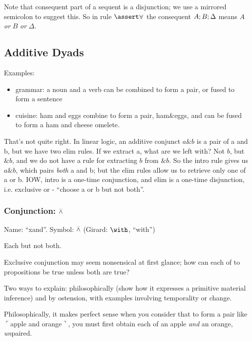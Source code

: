 \documentclass{article}
\begin{document}
Note that consequent part of a sequent is a disjunction; we use a
mirrored semicolon to suggest this. So in rule \(\linfer\fission\) the
consequent \(A\structor B\structor\Delta\) means \(A\) \textit{or}
\(B\) \textit{or} \(\Delta\).

\subsection{Additive Dyads}

Examples:

\begin{itemize}
\item grammar: a noun and a verb can be combined to form a pair, or fused to form a sentence
  \item cuisine: ham and eggs combine to form a pair, ham\&eggs, and
    can be fused to form a ham and cheese omelete.
\end{itemize}

That's not quite right. In linear logic, an additive conjunct \(a\&b\)
is a pair of a and b, but we have two elim rules. If we extract a,
what are we left with? Not \(b\), but \(\&b\), and we do not have a
rule for extracting \(b\) from \(\&b\). So the intro rule gives us
\(a\&b\), which pairs \textit{both} a and b; but the elim rules allow
us to retrieve only one of a or b. IOW, intro is a one-time
conjunction, and elim is a one-time disjunction, i.e. exclusive or -
``choose a or b but not both''.



\subsubsection[Conjunction: each but not both]{Conjunction: \(\barwedge\)}

Name: ``xand''.  Symbol: \(\barwedge\) (Girard: \(\with\), ``with'')

Each but not both.

Exclusive conjunction may seem nonsensical at first glance; how can
each of to propositions be true unless both are true?

Two ways to explain: philosophically (show how it expresses a primitive
material inference) and by ostension, with examples involving
temporality or change.

Philosophically, it makes perfect sense when you consider that to form
a pair like \(\ulcorner\)apple and orange\(\urcorner\), you must first
obtain each of an apple \textit{and} an orange, \textit{un}paired.
\end{document}
